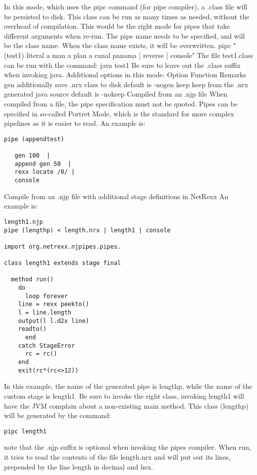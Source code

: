 In this mode, which uses the pipc command (for pipe compiler), a .class file will be persisted to disk. This class can be run as many times as needed, without the overhead of compilation. This would be the right mode for pipes that take different arguments when re-run.
The pipe name needs to be specified, and will be the class name. When the class name exists, it will be overwritten.
pipc "(test1) literal a man a plan a canal panama | reverse | console"
The file test1.class can be run with the command:
java test1
Be sure to leave out the .class suffix when invoking java.
Additional options in this mode:
Option
Function
Remarks
gen	additionally save .nrx class to disk	default is -nogen
keep	keep from the .nrx generated java source	default is -nokeep
Compiled from an .njp file
When compiled from a file, the pipe specification must not be quoted. Pipes can be specified in so-called Portret Mode, which is the standard for more complex pipelines as it is easier to read.
An example is:
\begin{verbatim}
pipe (appendtest)
 
   gen 100  |
   append gen 50  |
   rexx locate /0/ |
   console
\end{verbatim}
Compile from an .njp file with additional stage definitions in NetRexx
An example is:
\begin{verbatim}
length1.njp
pipe (lengthp) < length.nrx | length1 | console
 
import org.netrexx.njpipes.pipes.
 
class length1 extends stage final
 
  method run()
    do
      loop forever
    line = rexx peekto()
    l = line.length
    output(l l.d2x line)
    readto()
      end
    catch StageError
      rc = rc()
    end
    exit(rc*(rc<>12))
\end{verbatim}
In this example, the name of the generated pipe is lengthp, while the name of the custom stage is length1. Be sure to invoke the right class, invoking length1 will have the JVM complain about a non-existing main method.
This class (lengthp) will be generated by the command:
\begin{verbatim}
pipc length1
\end{verbatim}
note that the .njp suffix is optional when invoking the pipes compiler. When run, it tries to read the contents of the file length.nrx and will put out its lines, prepended by the line length in decimal and hex.





